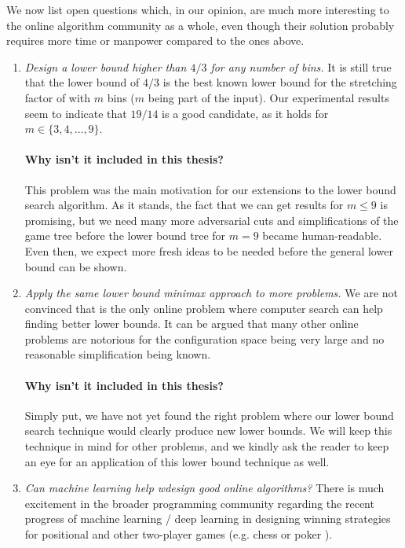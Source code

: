 We now list open questions which, in our opinion, are much more
interesting to the online algorithm community as a whole, even though
their solution probably requires more time or manpower compared to the
ones above.

\begin{enumerate}

\item \textit{Design a lower bound higher than $4/3$ for any number of
bins.} It is still true that the lower bound of $4/3$ is the best
known lower bound for the stretching factor of \binstretch with $m$
bins ($m$ being part of the input). Our experimental results seem to
indicate that $19/14$ is a good candidate, as it holds for $m \in
\{3,4,\ldots,9\}$. 

\paragraph{Why isn't it included in this thesis?} This problem was the
main motivation for our extensions to the lower bound search
algorithm. As it stands, the fact that we can get results for $m \le
9$ is promising, but we need many more adversarial cuts and
simplifications of the game tree before the lower bound tree for $m =
9$ became human-readable. Even then, we expect more fresh ideas to be
needed before the general lower bound can be shown.

\item \textit{Apply the same lower bound minimax approach to more
problems.} We are not convinced that \binstretch is the only online
problem where computer search can help finding better lower bounds.
It can be argued that many other online problems are notorious for the
configuration space being very large and no reasonable simplification
being known.

\paragraph{Why isn't it included in this thesis?} Simply put, we have
not yet found the right problem where our lower bound search technique
would clearly produce new lower bounds. We will keep this technique in
mind for other problems, and we kindly ask the reader to keep an eye
for an application of this lower bound technique as well.

\item \textit{Can machine learning help wdesign good online
algorithms?} There is much excitement in the broader programming
community regarding the recent progress of machine learning / deep
learning in designing winning strategies for positional and other
two-player games (e.g. chess \cite{alphago} or poker \cite{poker}).


\end{enumerate}
